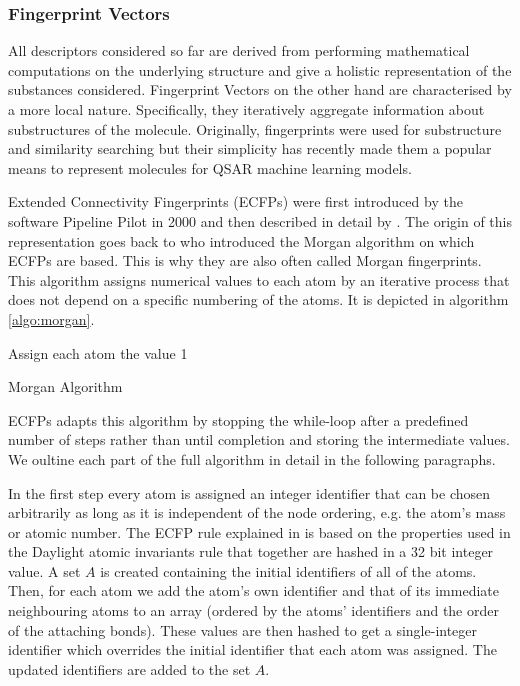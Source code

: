 \subsubsection{Fingerprint Vectors}
All descriptors considered so far are derived from performing mathematical computations on the underlying structure and give a holistic representation of the substances considered. Fingerprint Vectors on the other hand are characterised by a more local nature. Specifically, they iteratively aggregate information about substructures of the molecule. Originally, fingerprints were used for substructure and similarity searching but their simplicity has recently made them a popular means to represent molecules for QSAR machine learning models. 

Extended Connectivity Fingerprints (ECFPs) were first introduced by the software Pipeline Pilot in 2000 and then described in detail by \cite{ECFP}. The origin of this representation goes back to \cite{morgan} who introduced the Morgan algorithm on which ECFPs are based. This is why they are also often called Morgan fingerprints. This algorithm assigns numerical values to each atom by an iterative process that does not depend on a specific numbering of the atoms. It is depicted in algorithm \ref{algo:morgan}.

\begin{algorithm}[H]
	\SetAlgoLined
	Assign each atom the value 1\;
	\caption{Morgan Algorithm}
	\label{algo:morgan}
\end{algorithm}
ECFPs adapts this algorithm by stopping the while-loop after a predefined number of steps rather than until completion and storing the intermediate values. We oultine each part of the full algorithm in detail in the following paragraphs.

In the first step every atom is assigned an integer identifier that can be chosen arbitrarily as long as it is independent of the node ordering, e.g. the atom's mass or atomic number. The ECFP rule explained in \cite{ECFP} is based on the properties used in the Daylight atomic invariants rule \citep{smiles2} that together are hashed in a 32 bit integer value.  A set $A$ is created containing the initial identifiers of all of the atoms. Then, for each atom we add the atom's own identifier and that of its immediate neighbouring atoms to an array (ordered by the atoms' identifiers and the order of the attaching bonds). These values are then hashed to get a single-integer identifier which overrides the initial identifier that each atom was assigned. The updated identifiers are added to the set $A$.

